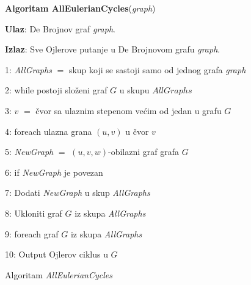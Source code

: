 \documentclass[12pt,oneside]{memoir}
\begin{document}
\begin{figure}[!ht]
\begin{tcolorbox}
\textbf{Algoritam AllEulerianCycles}(\textit{graph})

\textbf{Ulaz}:  De Brojnov graf \textit{graph}.

\textbf{Izlaz}: Sve Ojlerove putanje u De Brojnovom grafu \textit{graph}.

1: \textit{AllGraphs} $=$ skup koji se sastoji samo od jednog grafa \textit{graph}

2: while postoji složeni graf $G$ u skupu $AllGraphs$

3:\hspace{1cm} $v$ $=$ čvor sa ulaznim stepenom većim od jedan u grafu $G$

4:\hspace{1cm} foreach ulazna grana $(u, v)$ u čvor $v$
    
5:\hspace{2cm} \textit{NewGraph} $=$ $(u, v, w)$-obilazni graf grafa $G$

6:\hspace{2cm} if \textit{NewGraph} je povezan

7:\hspace{3cm} Dodati \textit{NewGraph} u skup \textit{AllGraphs}

8:\hspace{1cm} Ukloniti graf $G$ iz skupa \textit{AllGraphs}

9: foreach graf $G$ iz skupa \textit{AllGraphs}

10:\hspace{1cm} Output Ojlerov ciklus u $G$
\end{tcolorbox}
\caption{Algoritam \textit{AllEulerianCycles} \cite{bioinformaticsAlg}}
\label{box:allEulerianCycles}
\end{figure}
\end{document}
